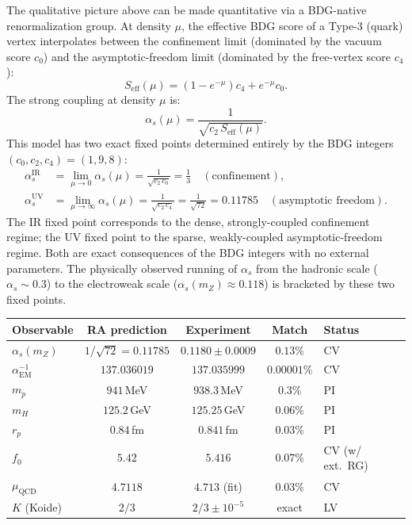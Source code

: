 \documentclass[11pt]{article}
\begin{document}
The qualitative picture above can be made quantitative via a BDG-native renormalization group. At density $\mu$, the effective BDG score of a Type-3 (quark) vertex interpolates between the confinement limit (dominated by the vacuum score $c_0$) and the asymptotic-freedom limit (dominated by the free-vertex score $c_4$):
\begin{equation}
S_{\mathrm{eff}}(\mu) = (1-e^{-\mu})c_4 + e^{-\mu}c_0.
\end{equation}
The strong coupling at density $\mu$ is:
\begin{equation}
\alpha_s(\mu) = \frac{1}{\sqrt{c_2\,S_{\mathrm{eff}}(\mu)}}.
\end{equation}
This model has two exact fixed points determined entirely by the BDG integers $(c_0,c_2,c_4)=(1,9,8)$:
\begin{align}
\alpha_s^{\mathrm{IR}} &= \lim_{\mu\to 0}\alpha_s(\mu) = \frac{1}{\sqrt{c_2\,c_0}} = \frac{1}{3}\quad (\text{confinement}),\\
\alpha_s^{\mathrm{UV}} &= \lim_{\mu\to\infty}\alpha_s(\mu) = \frac{1}{\sqrt{c_2\,c_4}} = \frac{1}{\sqrt{72}} = 0.11785\quad (\text{asymptotic freedom}).
\end{align}
The IR fixed point corresponds to the dense, strongly-coupled confinement regime; the UV fixed point to the sparse, weakly-coupled asymptotic-freedom regime. Both are exact consequences of the BDG integers with no external parameters. The physically observed running of $\alpha_s$ from the hadronic scale ($\alpha_s\sim 0.3$) to the electroweak scale ($\alpha_s(m_Z)\approx 0.118$) is bracketed by these two fixed points.

\begin{center}
\begin{tabular}{lcccl}
\toprule
Observable & RA prediction & Experiment & Match & Status \\
\midrule
$\alpha_s(m_Z)$ & $1/\sqrt{72}=0.11785$ & $0.1180\pm 0.0009$ & $0.13\%$ & CV \\
$\alpha_{\mathrm{EM}}^{-1}$ & $137.036019$ & $137.035999$ & $0.00001\%$ & CV \\
$m_p$ & $941$\,MeV & $938.3$\,MeV & $0.3\%$ & PI \\
$m_H$ & $125.2$\,GeV & $125.25$\,GeV & $0.06\%$ & PI \\
$r_p$ & $0.84$\,fm & $0.841$\,fm & $0.03\%$ & PI \\
$f_0$ & $5.42$ & $5.416$ & $0.07\%$ & CV (w/ ext.\ RG) \\
$\mu_{\mathrm{QCD}}$ & $4.7118$ & $4.713$ (fit) & $0.03\%$ & CV \\
$K$ (Koide) & $2/3$ & $2/3\pm 10^{-5}$ & exact & LV \\
\bottomrule
\end{tabular}
\end{center}
\end{document}
